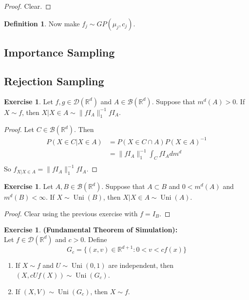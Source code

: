 \documentclass[12pt]{amsart}
\theoremstyle{definition}
\newtheorem{defn}[definition]{Definition}
\newtheorem{ex}[definition]{Exercise}
\newcommand{\R}{\mathbb{R}}
\newcommand{\MB}{\mathcal{B}}
\newcommand{\MD}{\mathcal{D}}
\DeclareMathOperator{\uni}{Uni}
\begin{document}
	\begin{proof}
	Clear.
	\end{proof}
	
	\begin{defn}
	Now make $f_j \sim GP(\mu_j, c_j)$. 	
	\end{defn}
	
	\subsection{Importance Sampling}
	
	\subsection{Rejection Sampling}
	
	\begin{ex}
		Let $f, g \in \MD(\R^d)$ and $A \in \MB(\R^d)$. Suppose that $m^d(A) > 0$. If $X \sim f$, then $X|X \in A \sim \|fI_A\|_1^{-1}fI_A$. 
	\end{ex}

	\begin{proof}
		Let $C \in \MB(\R^d)$. Then
		\begin{align*}
			P(X \in C|X \in A)
			&= P(X \in C \cap A) P(X \in A)^{-1} \\
			&= \|fI_A\|_1^{-1} \int_C fI_A dm^d \\
		\end{align*}
		So $f_{X|X \in A} = \|fI_A\|_1^{-1}fI_A$.
	\end{proof}
	
	\begin{ex}
		Let $A, B \in \MB(\R^d)$. Suppose that $A \subset B$ and $0 < m^d(A)$ and $ m^{d}(B) < \infty$. If $X \sim \uni(B)$, then $X|X \in A \sim \uni(A)$. 
	\end{ex}

	\begin{proof}
		Clear using the previous exercise with $f = I_B$.
	\end{proof}
	
	\begin{ex}\textbf{(Fundamental Theorem of Simulation):} \\
		Let $f \in \MD(\R^d)$ and $c > 0$. Define $$G_c = \{(x,v) \in \R^{d+1}: 0< v < cf(x)\}$$ 
		\begin{enumerate}
			\item If $X \sim f$ and $U \sim \uni(0,1)$  are independent, then $(X, cUf(X)) \sim \uni(G_c)$.
			\item If $(X, V) \sim \uni(G_c)$, then $X \sim f$.
		\end{enumerate}
	\end{ex}
\end{document}
